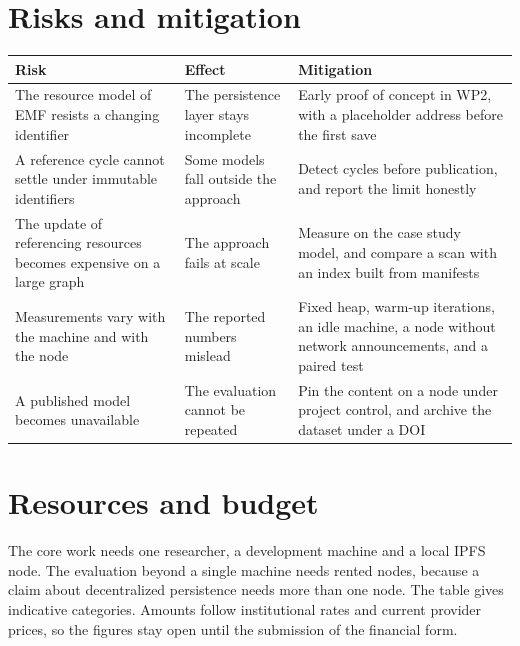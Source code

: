 \documentclass[11pt,a4paper]{article}
\begin{document}
\section{Risks and mitigation}

\begin{center}
\begin{tabular}{@{}p{50mm}p{44mm}p{55mm}@{}}
\toprule
Risk & Effect & Mitigation \\
\midrule
The resource model of EMF resists a changing identifier & The persistence layer stays incomplete & Early proof of concept in WP2, with a placeholder address before the first save \\
A reference cycle cannot settle under immutable identifiers & Some models fall outside the approach & Detect cycles before publication, and report the limit honestly \\
The update of referencing resources becomes expensive on a large graph & The approach fails at scale & Measure on the case study model, and compare a scan with an index built from manifests \\
Measurements vary with the machine and with the node & The reported numbers mislead & Fixed heap, warm-up iterations, an idle machine, a node without network announcements, and a paired test \\
A published model becomes unavailable & The evaluation cannot be repeated & Pin the content on a node under project control, and archive the dataset under a DOI \\
\bottomrule
\end{tabular}
\end{center}

\section{Resources and budget}

The core work needs one researcher, a development machine and a local IPFS node. The evaluation beyond a single machine needs rented nodes, because a claim about decentralized persistence needs more than one node. The table gives indicative categories. Amounts follow institutional rates and current provider prices, so the figures stay open until the submission of the financial form.
\end{document}
